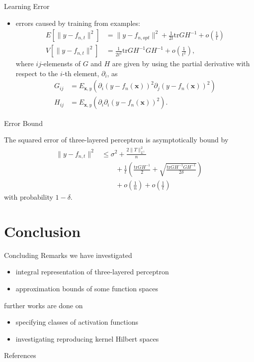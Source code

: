 \documentclass[fleqn,aspectratio=1610]{beamer}
\begin{document}
\begin{frame}[label={sec:orgcdaf5d3}]{Learning Error}
\begin{itemize}
\item errors caused by training from examples:
\begin{align}
  E\left[\|y-f_{n,t}\|^{2}\right]
  &=\|y-f_{n,opt}\|^{2}
    +\frac{1}{2t}\mathrm{tr} GH^{-1}+o\left(\frac{1}{t}\right)\\
  V\left[\|y-f_{n,t}\|^{2}\right]
  &=\frac{1}{2t^{2}}\mathrm{tr} GH^{-1}GH^{-1}
    +o\left(\frac{1}{t^{2}}\right),
\end{align}
where \(ij\)-elemensts of \(G\) and \(H\)
are given by using the partial derivative with respect to the
\(i\)-th element, \(\partial_{i}\), as
\begin{align}
  G_{ij}
  &=
    E_{\boldsymbol{x},y}(\partial_{i}(y-f_{n}(\boldsymbol{x}))^{2}
    \partial_{j}(y-f_{n}(\boldsymbol{x}))^{2})\\
  H_{ij}
  &=
    E_{\boldsymbol{x},y}(\partial_{i}\partial_{i}
    (y-f_{n}(\boldsymbol{x}))^{2}).
\end{align}
\end{itemize}
\end{frame}

\begin{frame}[label={sec:org192272b}]{Error Bound}
\begin{theorem}[]\label{sec:org732e9b3}
The squared error of three-layered perceptron
is asymptotically bound by
\begin{align}
  \|y-f_{n,t}\|^{2}
  &\leq \sigma^{2}+\frac{2\|T\|_{L^{1}}^2}{n}\\
  &\qquad+\frac{1}{t}\left(\frac{\mathrm{tr} GH^{-1}}{2}+
    \sqrt{\frac{\mathrm{tr} GH^{-1}GH^{-1}}{2\delta}}\right)\\
  &\qquad+o\left(\frac{1}{n}\right)+
    o\left(\frac{1}{t}\right)
\end{align}
with probability \(1-\delta\).
\end{theorem}
\end{frame}

\section{Conclusion}
\label{sec:org8861d2f}
\begin{frame}[label={sec:org1955a8e}]{Concluding Remarks}
we have investigated
\begin{itemize}
\item integral representation of three-layered perceptron
\item approximation bounds of some function spaces
\end{itemize}

further works are done on
\begin{itemize}
\item specifying classes of activation functions
\item investigating reproducing kernel Hilbert spaces
\end{itemize}
\end{frame}


\begin{frame}[allowframebreaks]{References}
\printbibliography[heading=none]
\end{frame}
\end{document}
